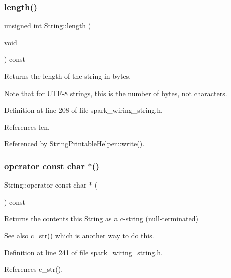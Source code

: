 \subsubsection{\texorpdfstring{length()}{length()}}
{\footnotesize\ttfamily unsigned int String\+::length (\begin{DoxyParamCaption}\item[{void}]{ }\end{DoxyParamCaption}) const\hspace{0.3cm}{\ttfamily [inline]}}



Returns the length of the string in bytes. 

Note that for U\+T\+F-\/8 strings, this is the number of bytes, not characters. 

Definition at line 208 of file spark\+\_\+wiring\+\_\+string.\+h.



References len.



Referenced by String\+Printable\+Helper\+::write().

\mbox{\label{class_string_a9a12caedc885ac44c86d104a8cb60f82}} 
\subsubsection{\texorpdfstring{operator const char $\ast$()}{operator const char *()}}
{\footnotesize\ttfamily String\+::operator const char $\ast$ (\begin{DoxyParamCaption}{ }\end{DoxyParamCaption}) const\hspace{0.3cm}{\ttfamily [inline]}}



Returns the contents this \hyperlink{class_string}{String} as a c-\/string (null-\/terminated) 

See also \hyperlink{class_string_a0274f3e61533d15086816fb7f47ccb54}{c\+\_\+str()} which is another way to do this. 

Definition at line 241 of file spark\+\_\+wiring\+\_\+string.\+h.



References c\+\_\+str().

\mbox{\label{class_string_aa15ca61ec96c4068e07c23fea25625fa}} 
